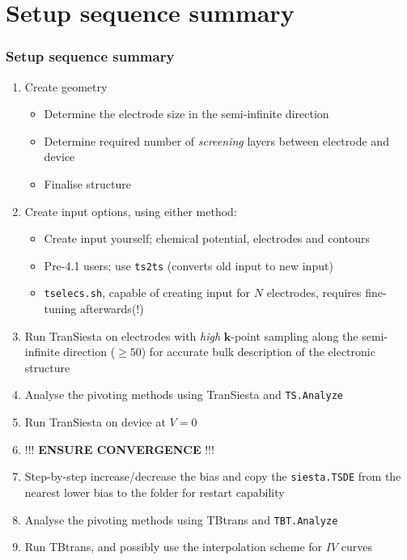 \section{Setup sequence summary}

\begin{frame}
  \frametitle{Setup sequence summary}

  \begin{enumerate}%

    \item Create geometry
    \begin{itemize}
      \item Determine the electrode size in the semi-infinite direction

      \item Determine required number of \emph{screening} layers between electrode and device
      \item Finalise structure
    \end{itemize}

    \item Create input options, using either method:
    \begin{itemize}
      \item Create input yourself; chemical potential, electrodes and contours

      \item Pre-4.1 users; use \texttt{ts2ts} (converts old input to new input)

      \item \texttt{tselecs.sh}, capable of creating input for $N$ electrodes, requires
      fine-tuning afterwards(!)

    \end{itemize}
    
    \item Run TranSiesta on electrodes with \emph{high} $\mathbf k$-point sampling along
    the semi-infinite direction ($\ge50$)
    for accurate bulk description of the electronic structure

    \item Analyse the pivoting methods using TranSiesta and \texttt{TS.Analyze}

    \item Run TranSiesta on device at $V=0$

    \item !!! \textbf{ENSURE CONVERGENCE} !!!

    \item Step-by-step increase/decrease the bias and copy the \texttt{siesta.TSDE} from
    the nearest lower bias to the folder for restart capability

    \item Analyse the pivoting methods using TBtrans and \texttt{TBT.Analyze}
    
    \item Run TBtrans, and possibly use the interpolation scheme for $IV$ curves
    
  \end{enumerate}

\end{frame}

